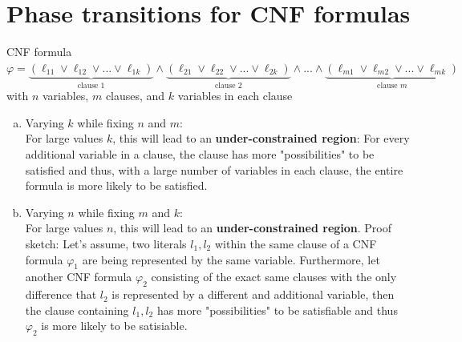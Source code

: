 \documentclass{article} %
\begin{document}
\section{Phase transitions for CNF formulas}
CNF formula $
    \varphi =
    \underbrace{(\ell_{11} \lor \ell_{12} \lor ... \lor \ell_{1k})}_{\text{clause } 1}
    \land
    \underbrace{(\ell_{21} \lor \ell_{22} \lor ... \lor \ell_{2k})}_{\text{clause } 2}
    \land
    ...
    \land
    \underbrace{(\ell_{m1} \lor \ell_{m2} \lor ... \lor \ell_{mk})}_{\text{clause } m}
$\\[1em]
with $n$ variables, $m$ clauses, and $k$ variables in each clause
\begin{enumerate}[(a)]
    \item Varying $k$ while fixing $n$ and $m$:\\[0.5em]
    For large values $k$, this will lead to an
    \textbf{under-constrained region}: For every
    additional variable in a clause, the clause
    has more "possibilities" to be satisfied and
    thus, with a large number of variables in each
    clause, the entire formula is more likely to be
    satisfied.
    \item Varying $n$ while fixing $m$ and $k$:\\[0.5em]
    For large values $n$, this will lead to an
    \textbf{under-constrained region}.
    Proof sketch: Let's assume, two
    literals $l_1, l_2$ within the same clause of
    a CNF formula $\varphi_1$ are being represented
    by the same variable.
    Furthermore, let another CNF formula $\varphi_2$
    consisting of the exact same clauses with the
    only difference that $l_2$ is represented by a
    different and additional variable, then the
    clause containing $l_1, l_2$ has more
    "possibilities" to be satisfiable and thus
    $\varphi_2$ is more likely to be satisiable. 
\end{enumerate}
\end{document}
